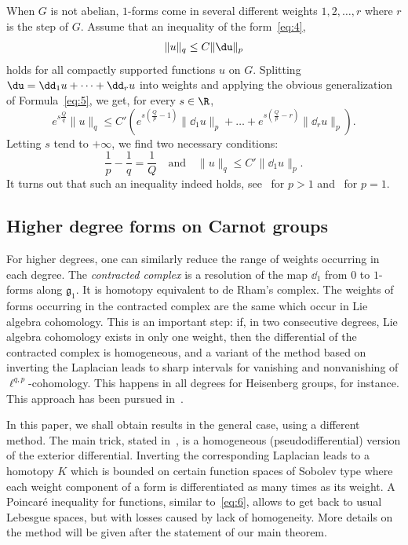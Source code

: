 When $G$ is not abelian, $1$-forms come in several different weights $1,2,\dots,r$ where $r$ is the step of $G$. Assume that an inequality of the form~\eqref{eq:4},
\begin{equation*}
\|u\|_q \leq C \|\du\|_p
\end{equation*}
holds for all compactly supported functions $u$ on $G$. Splitting $\du=\dd_1 u+\dots +\dd_r u$ into weights and applying the obvious generalization of Formula~\eqref{eq:5}, we get, for every $s\in\R$,
\begin{equation*}
e^{s\frac{Q}{q}} \|u\|_q \leq C' \left(e^{s(\frac{Q}{p}-1)}\|\dd_1 u\|_p+\dots +e^{s(\frac{Q}{p}-r)}\|\dd_r u\|_p\right).
\end{equation*}
Letting $s$ tend to $+\infty$, we find two necessary conditions:
\begin{equation}\label{eq:6}
\frac{1}{p}-\frac{1}{q}=\frac{1}{Q} \quad \text{and}\quad \|u\|_q \leq C' \|\dd_1 u\|_p.
\end{equation}
It turns out that such an inequality indeed holds, see~\cite{FollandStein} for $p>1$ and~\cite{VCSC} for $p=1$.

\subsection{Higher degree forms on Carnot groups}

For higher degrees, one can similarly reduce the range of weights occurring in each degree. The \emph{contracted complex} is a resolution of the map $\dd_1$ from $0$ to $1$-forms along $\mathfrak{g}_1$. It is homotopy equivalent to de Rham's complex. The weights of forms occurring in the contracted complex are the same which occur in Lie algebra cohomology. This is an important step: if, in two consecutive degrees, Lie algebra cohomology exists in only one weight, then the differential of the contracted complex is homogeneous, and a variant of the method based on inverting the Laplacian leads to sharp intervals for vanishing and nonvanishing of $\ell^{q,p}$-cohomology. This happens in all degrees for Heisenberg groups, for instance. This approach has been pursued in~\cite{BFP}.

In this paper, we shall obtain results in the general case, using a different method. The main trick, stated in~\cite{Rumin_CRAS_1999}, is a homogeneous (pseudodifferential) version of the exterior differential. Inverting the corresponding Laplacian leads to a homotopy $K$ which is bounded on certain function spaces of Sobolev type where each weight component of a form is differentiated as many times as its weight. A Poincar\'e inequality for functions, similar to~\eqref{eq:6}, allows to get back to usual Lebesgue spaces, but with losses caused by lack of homogeneity. More details on the method will be given after the statement of our main theorem.

